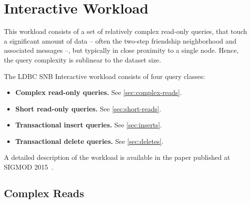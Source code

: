 \chapter{Interactive Workload}
\label{section:interactive}

This workload consists of a set of relatively complex read-only queries, that touch a significant
amount of data -- often the two-step friendship neighborhood and associated messages --, but typically in close proximity to a single node. Hence, the query complexity is sublinear to the dataset size.

The LDBC SNB Interactive workload consists of four query classes:

\begin{itemize}
\item \textbf{Complex read-only queries.} See \autoref{sec:complex-reads}.
\item \textbf{Short read-only queries.} See \autoref{sec:short-reads}.
\item \textbf{Transactional insert queries.} See \autoref{sec:inserts}.
\item \textbf{Transactional delete queries.} See \autoref{sec:deletes}.
\end{itemize}

A detailed description of the workload is available in the paper published at \mbox{SIGMOD} 2015~\cite{DBLP:conf/sigmod/ErlingALCGPPB15}.


\section{Complex Reads}
\label{sec:complex-reads}
















